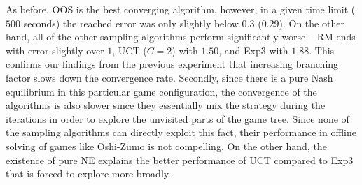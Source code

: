 As before, OOS is the best converging algorithm, however, in a given time limit ($500$ seconds) the reached error was only slightly below $0.3$ ($0.29$). On the other hand, all of the other sampling algorithms perform significantly worse -- RM ends with error slightly over $1$, UCT ($C=2$) with $1.50$, and Exp3 with $1.88$.
This confirms our findings from the previous experiment that increasing branching factor slows down the convergence rate.
Secondly, since there is a pure Nash equilibrium in this particular game configuration, the convergence of the algorithms is also slower since they essentially mix the strategy during the iterations in order to explore the unvisited parts of the game tree. Since none of the sampling algorithms can directly exploit this fact, their performance in offline solving of games like Oshi-Zumo is not compelling. On the other hand, the existence of pure NE explains the better performance of UCT compared to Exp3 that is forced to explore more broadly.


